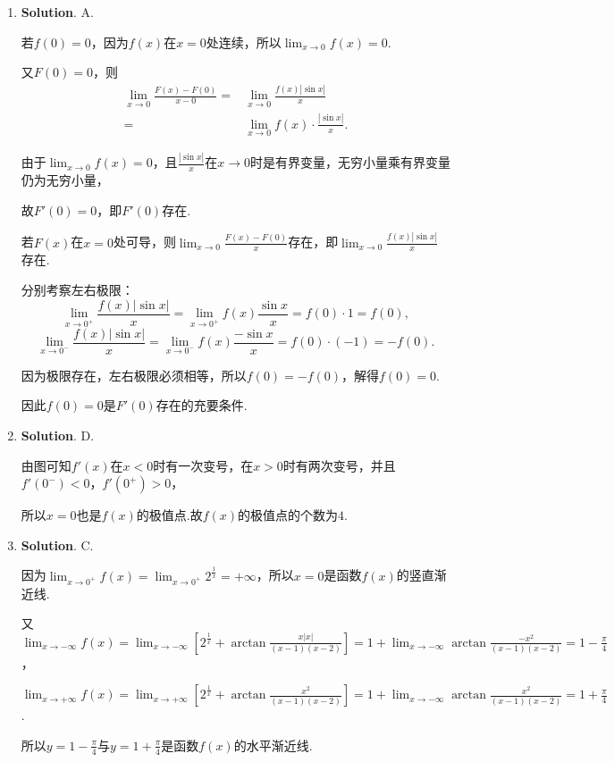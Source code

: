 \documentclass[../Main.tex]{subfiles}
\begin{document}
\begin{enumerate}
          所以$k=1$，$c=2$，无穷小主部为$2(x-1)$.

    \item \textbf{Solution}. A.

          若$f(0)=0$，因为$f(x)$在$x=0$处连续，所以$\lim_{x\to0}f(x)=0$.

          又$F(0)=0$，则
          \[
              \begin{aligned}
                  \lim_{x\to0}\frac{F(x)-F(0)}{x-0}= & \lim_{x\to0}\frac{f(x)|\sin x|}{x}       \\
                  =                                  & \lim_{x\to0}f(x)\cdot\frac{|\sin x|}{x}.
              \end{aligned}
          \]

          由于$\lim_{x\to0}f(x)=0$，且$\frac{|\sin x|}{x}$在$x\to0$时是有界变量，无穷小量乘有界变量仍为无穷小量，

          故$F'(0)=0$，即$F'(0)$存在.

          若$F(x)$在$x=0$处可导，则$\lim_{x\to0}\frac{F(x)-F(0)}{x}$存在，即$\lim_{x\to0}
              \frac{f(x)|\sin x|}{x}$存在.

          分别考察左右极限：
          \[
              \lim_{x\to0^+}\frac{f(x)|\sin x|}{x}=\lim_{x\to0^+}f(x)\frac{\sin x}{x}=f
              (0)\cdot 1 = f(0),
          \]
          \[
              \lim_{x\to0^-}\frac{f(x)|\sin x|}{x}=\lim_{x\to0^-}f(x)\frac{-\sin x}{x}=
              f(0)\cdot (-1) = -f(0).
          \]

          因为极限存在，左右极限必须相等，所以$f(0)=-f(0)$，解得$f(0)=0$.

          因此$f(0)=0$是$F'(0)$存在的充要条件.

    \item \textbf{Solution}. D.

          由图可知$f'(x)$在$x<0$时有一次变号，在$x>0$时有两次变号，并且$f'(0^{-})<0$，$f
              '(0^{+})>0$，

          所以$x=0$也是$f(x)$的极值点.故$f(x)$的极值点的个数为$4$.

    \item \textbf{Solution}. C.

          因为$\lim_{x\to0^+}f(x)=\lim_{x\to0^+}2^{\frac{1}{x}}=+\infty$，所以$x=0$是函数$f
              (x)$的竖直渐近线.

          又$\lim_{x\to-\infty}f(x)=\lim_{x\to-\infty}\left[2^{\frac{1}{x}}+\arctan\frac{x|x|}{(x-1)(x-2)}
                  \right]=1+\lim_{x\to-\infty}\arctan\frac{-x^{2}}{(x-1)(x-2)}=1-\frac{\pi}{4}$，

          $\lim_{x\to+\infty}f(x)=\lim_{x\to+\infty}\left[2^{\frac{1}{x}}+\arctan\frac{x^{2}}{(x-1)(x-2)}
                  \right]=1+\lim_{x\to-\infty}\arctan\frac{x^{2}}{(x-1)(x-2)}=1+\frac{\pi}{4}$.

          所以$y=1-\frac{\pi}{4}$与$y=1+\frac{\pi}{4}$是函数$f(x)$的水平渐近线.
\end{enumerate}
\end{document}
